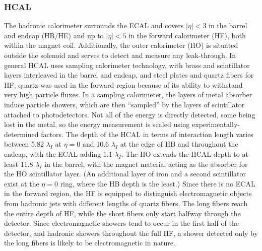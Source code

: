 \subsubsection{HCAL}
\label{exp:HCAL}
The hadronic calorimeter surrounds the ECAL and 
covers $|\eta| < 3$ in the barrel and endcap (HB/HE) 
and up to $|\eta| < 5$ in the forward calorimeter (HF),
both within the magnet coil.
Additionally, the outer calorimeter (HO) is situated 
outside the solenoid and serves to detect 
and measure any leak-through.
In general HCAL uses sampling calorimeter technology, 
with brass and scintillator layers interleaved 
in the barrel and endcap, 
and steel plates and quartz fibers for HF; 
quartz was used in the forward region 
because of its ability to 
withstand very high particle fluxes.  
In a sampling calorimeter, the layers of metal absorber 
induce particle showers, which are then 
``sampled'' by the layers of scintillator 
attached to photodetectors.  
Not all of the energy is directly detected, 
some being lost in the metal,
so the energy measurement is scaled using 
experimentally-determined factors.  
The depth of the HCAL 
in terms of interaction length 
varies between 5.82 $\lambda_I$ at $\eta = 0$ and 
10.6 $\lambda_I$ at the edge of HB and throughout 
the endcap, 
with the ECAL adding 1.1 $\lambda_I$.  
The HO extends the HCAL depth to at least 
11.8 $\lambda_I$ in the barrel, 
with the magnet material acting as the absorber for 
the HO scintillator layer.  
(An additional layer of iron and 
a second scintillator exist
at the $\eta = 0$ ring, 
where the HB depth is the least.)
Since there is no ECAL in the forward region, 
the HF is equipped to distinguish electromagnetic 
objects from hadronic jets with different 
lengths of quartz fibers.  
The long fibers reach the entire depth of HF, 
while the short fibers only start halfway through 
the detector.
Since electromagnetic showers tend to occur in the 
first half of the detector, 
and hadronic showers throughout the full HF, 
a shower detected only by the long fibers 
is likely to be electromagnetic in nature.  

